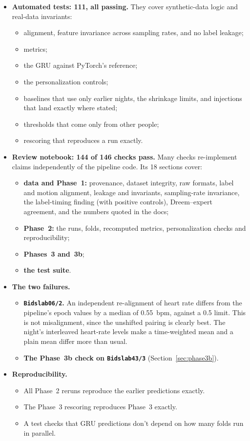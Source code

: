 \documentclass[11pt,a4paper]{article}
\newcommand{\night}[2]{\texttt{Bidslab#1/#2}}
\begin{document}
\begin{itemize}
\item \textbf{Automated tests: 111, all passing.} They cover synthetic-data logic and real-data
invariants:
  \begin{itemize}
  \item alignment, feature invariance across sampling rates, and no label leakage;
  \item metrics;
  \item the GRU against PyTorch's reference;
  \item the personalization controls;
  \item baselines that use only earlier nights, the shrinkage limits, and injections that land
  exactly where stated;
  \item thresholds that come only from other people;
  \item rescoring that reproduces a run exactly.
  \end{itemize}
\item \textbf{Review notebook: 144 of 146 checks pass.} Many checks re-implement claims
independently of the pipeline code. Its 18 sections cover:
  \begin{itemize}
  \item \textbf{data and Phase~1:} provenance, dataset integrity, raw formats, label and motion
  alignment, leakage and invariants, sampling-rate invariance, the label-timing finding (with
  positive controls), Dreem--expert agreement, and the numbers quoted in the docs;
  \item \textbf{Phase~2:} the runs, folds, recomputed metrics, personalization checks and
  reproducibility;
  \item \textbf{Phases~3 and~3b};
  \item \textbf{the test suite}.
  \end{itemize}
\item \textbf{The two failures.}
  \begin{itemize}
  \item \textbf{\night{06}{2}.} An independent re-alignment of heart rate differs from the
  pipeline's epoch values by a median of 0.55~bpm, against a 0.5 limit. This is not
  misalignment, since the unshifted pairing is clearly best. The night's interleaved heart-rate
  levels make a time-weighted mean and a plain mean differ more than usual.
  \item \textbf{The Phase~3b check on \night{43}{3}} (Section~\ref{sec:phase3b}).
  \end{itemize}
\item \textbf{Reproducibility.}
  \begin{itemize}
  \item All Phase~2 reruns reproduce the earlier predictions exactly.
  \item The Phase~3 rescoring reproduces Phase~3 exactly.
  \item A test checks that GRU predictions don't depend on how many folds run in parallel.
  \end{itemize}
\end{itemize}
\end{document}

